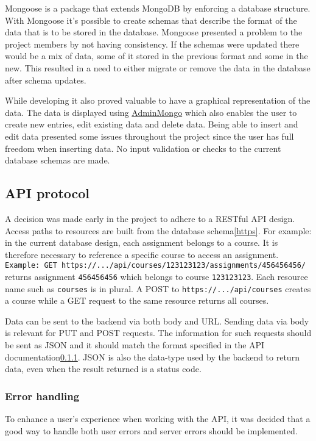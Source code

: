 Mongoose is a package that extends MongoDB by enforcing a database structure. With Mongoose it's possible to create schemas that describe the format of the data that is to be stored in the database. Mongoose presented a problem to the project members by not having consistency. If the schemas were updated there would be a mix of data, some of it stored in the previous format and some in the new. This resulted in a need to either migrate or remove the data in the database after schema updates.

While developing it also proved valuable to have a graphical representation of the data. The data is displayed using \href{https://github.com/mrvautin/adminMongo}{AdminMongo} which also enables the user to create new entries, edit existing data and delete data. Being able to insert and edit data presented some issues throughout the project since the user has full freedom when inserting data. No input validation or checks to the current database schemas are made. 


\subsection{API protocol}
A decision was made early in the project to adhere to a RESTful API design. Access paths to resources are built from the database schema\ref{https}. For example: in the current database design, each assignment belongs to a course. It is therefore necessary to reference a specific course to access an assignment. \texttt{Example: GET https://.../api/courses/123123123/assignments/456456456/} returns assignment \texttt{456456456} which belongs to course \texttt{123123123}. Each resource name such as \texttt{courses} is in plural. A POST to \texttt{https://.../api/courses} creates a course while a GET request to the same resource returns all courses.

Data can be sent to the backend via both body and URL. Sending data via body is relevant for PUT and POST requests. The information for such requests should be sent as JSON and it should match the format specified in the API documentation\ref{}. JSON is also the data-type used by the backend to return data, even when the result returned is a status code.

\subsubsection{Error handling}
To enhance a user's experience when working with the API, it was decided that a good way to handle both user errors and server errors should be implemented.

